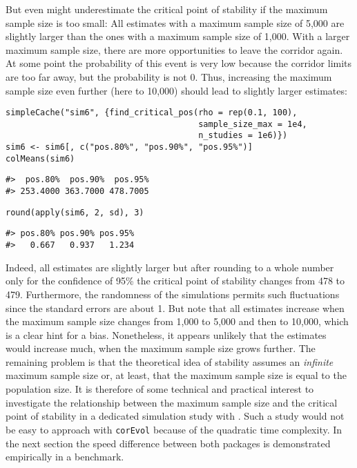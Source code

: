 But even  might underestimate the critical point of stability if the maximum sample size is too small: All estimates with a maximum sample size of 5,000 are slightly larger than the ones with a maximum sample size of 1,000. With a larger maximum sample size, there are more opportunities to leave the corridor again. At some point the probability of this event is very low because the corridor limits are too far away, but the probability is not 0. Thus, increasing the maximum sample size even further (here to 10,000) should lead to slightly larger estimates:

\begin{verbatim}
simpleCache("sim6", {find_critical_pos(rho = rep(0.1, 100),
                                       sample_size_max = 1e4, 
                                       n_studies = 1e6)})
sim6 <- sim6[, c("pos.80%", "pos.90%", "pos.95%")]
colMeans(sim6)
\end{verbatim}

\begin{verbatim}
#>  pos.80%  pos.90%  pos.95% 
#> 253.4000 363.7000 478.7005
\end{verbatim}

\begin{verbatim}
round(apply(sim6, 2, sd), 3)
\end{verbatim}

\begin{verbatim}
#> pos.80% pos.90% pos.95% 
#>   0.667   0.937   1.234
\end{verbatim}

Indeed, all estimates are slightly larger but after rounding to a whole number only for the confidence of 95\% the critical point of stability changes from 478 to 479. Furthermore, the randomness of the simulations permits such fluctuations since the standard errors are about 1. But note that all estimates increase when the maximum sample size changes from 1,000 to 5,000 and then to 10,000, which is a clear hint for a bias. Nonetheless, it appears unlikely that the estimates would increase much, when the maximum sample size grows further. The remaining problem is that the theoretical idea of stability assumes an \emph{infinite} maximum sample size or, at least, that the maximum sample size is equal to the population size. It is therefore of some technical and practical interest to investigate the relationship between the maximum sample size and the critical point of stability in a dedicated simulation study with . Such a study would not be easy to approach with \texttt{corEvol} because of the quadratic time complexity. In the next section the speed difference between both packages is demonstrated empirically in a benchmark.

